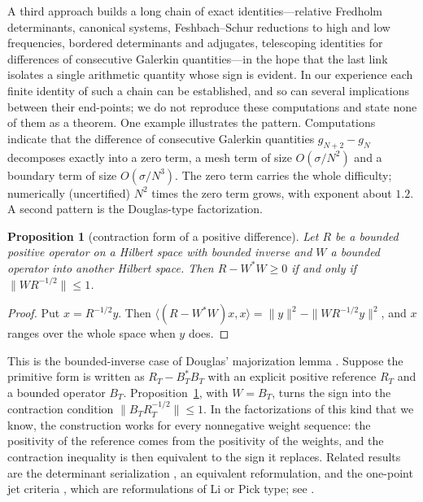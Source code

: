 \documentclass[11pt]{amsart}
\newtheorem{proposition}[theorem]{Proposition}
\theoremstyle{definition}
\theoremstyle{remark}
\numberwithin{equation}{section}
\begin{document}
\label{w6:fam:R12}
A third approach builds a long chain of exact identities---relative Fredholm determinants,
canonical systems, Feshbach--Schur reductions to high and low frequencies, bordered determinants
and adjugates, telescoping identities for differences of consecutive Galerkin quantities---in the
hope that the last link isolates a single arithmetic quantity whose sign is evident. In our
experience each finite identity of such a chain can be established, and so can several
implications between their end-points; we do not reproduce these computations and state none of
them as a theorem. One example illustrates the pattern. Computations indicate that the difference
of consecutive Galerkin quantities $g_{N+2}-g_N$ decomposes exactly into a zero term, a mesh term
of size $O(\sigma/N^2)$ and a boundary term of size $O(\sigma/N^3)$. The zero term carries the
whole difficulty; numerically (uncertified) $N^2$ times the zero term grows, with exponent about
$1.2$. A second pattern is the Douglas-type factorization.

\begin{proposition}[contraction form of a positive difference]\label{w6:prop:douglas}
Let $R$ be a bounded positive operator on a Hilbert space with bounded inverse and $W$ a bounded
operator into another Hilbert space. Then $R-W^*W\ge0$ if and only if $\|WR^{-1/2}\|\le1$.
\end{proposition}
\begin{proof}
Put $x=R^{-1/2}y$. Then $\langle(R-W^*W)x,x\rangle=\|y\|^2-\|WR^{-1/2}y\|^2$, and $x$ ranges over
the whole space when $y$ does.
\end{proof}

This is the bounded-inverse case of Douglas' majorization lemma \cite{Douglas1966}. Suppose the
primitive form is written as $R_T-B_T^*B_T$ with an explicit positive reference $R_T$ and a bounded
operator $B_T$. Proposition~\ref{w6:prop:douglas}, with $W=B_T$, turns the sign into the
contraction condition $\|B_TR_T^{-1/2}\|\le1$. In the factorizations of this kind that we know,
the construction works for every nonnegative weight sequence: the positivity of the reference
comes from the positivity of the weights, and the contraction inequality is then equivalent to the
sign it replaces. Related results are the determinant serialization \cite[Theorem~9.39]{P36}, an
equivalent reformulation, and the one-point jet criteria \cite[Theorems~9.53 and 9.100]{P36},
which are reformulations of Li or Pick type; see \cite[Section~9]{P36}.
\end{document}

